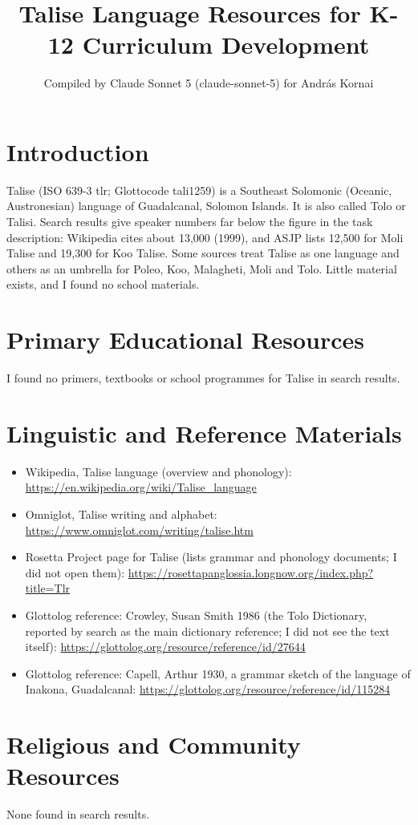 \documentclass[12pt]{article}
\title{Talise Language Resources for K-12 Curriculum Development}
\author{Compiled by Claude Sonnet 5 (claude-sonnet-5) for Andr\'as Kornai}
\date{}
\begin{document}
\maketitle

\section{Introduction}
Talise (ISO 639-3 tlr; Glottocode tali1259) is a Southeast Solomonic (Oceanic, Austronesian) language of Guadalcanal, Solomon Islands. It is also called Tolo or Talisi. Search results give speaker numbers far below the figure in the task description: Wikipedia cites about 13,000 (1999), and ASJP lists 12,500 for Moli Talise and 19,300 for Koo Talise. Some sources treat Talise as one language and others as an umbrella for Poleo, Koo, Malagheti, Moli and Tolo. Little material exists, and I found no school materials.

\section{Primary Educational Resources}
I found no primers, textbooks or school programmes for Talise in search results.

\section{Linguistic and Reference Materials}
\begin{itemize}
\item Wikipedia, Talise language (overview and phonology): \url{https://en.wikipedia.org/wiki/Talise_language}
\item Omniglot, Talise writing and alphabet: \url{https://www.omniglot.com/writing/talise.htm}
\item Rosetta Project page for Talise (lists grammar and phonology documents; I did not open them): \url{https://rosettapanglossia.longnow.org/index.php?title=Tlr}
\item Glottolog reference: Crowley, Susan Smith 1986 (the Tolo Dictionary, reported by search as the main dictionary reference; I did not see the text itself): \url{https://glottolog.org/resource/reference/id/27644}
\item Glottolog reference: Capell, Arthur 1930, a grammar sketch of the language of Inakona, Guadalcanal: \url{https://glottolog.org/resource/reference/id/115284}
\end{itemize}

\section{Religious and Community Resources}
None found in search results.
\end{document}
